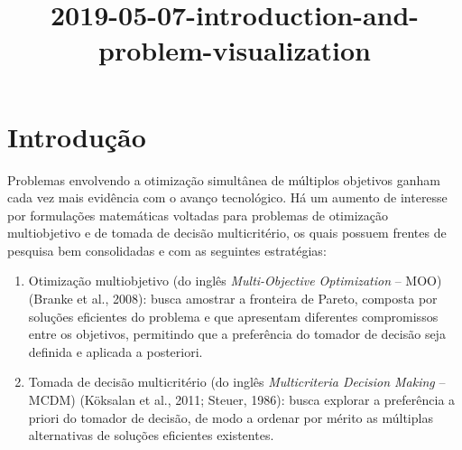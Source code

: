 \documentclass[11pt]{article}
\title{2019-05-07-introduction-and-problem-visualization}
\begin{document}
    
    
    \maketitle
    
    

    
    \section{Introdução}\label{introduuxe7uxe3o}

Problemas envolvendo a otimização simultânea de múltiplos objetivos
ganham cada vez mais evidência com o avanço tecnológico. Há um aumento
de interesse por formulações matemáticas voltadas para problemas de
otimização multiobjetivo e de tomada de decisão multicritério, os quais
possuem frentes de pesquisa bem consolidadas e com as seguintes
estratégias:

\begin{enumerate}
\def\labelenumi{\arabic{enumi}.}
\item
  Otimização multiobjetivo (do inglês \emph{Multi-Objective
  Optimization} -- MOO) (Branke et al., 2008): busca amostrar a
  fronteira de Pareto, composta por soluções eficientes do problema e
  que apresentam diferentes compromissos entre os objetivos, permitindo
  que a preferência do tomador de decisão seja definida e aplicada a
  posteriori.
\item
  Tomada de decisão multicritério (do inglês \emph{Multicriteria
  Decision Making} -- MCDM) (Köksalan et al., 2011; Steuer, 1986): busca
  explorar a preferência a priori do tomador de decisão, de modo a
  ordenar por mérito as múltiplas alternativas de soluções eficientes
  existentes.
\end{enumerate}
\end{document}
